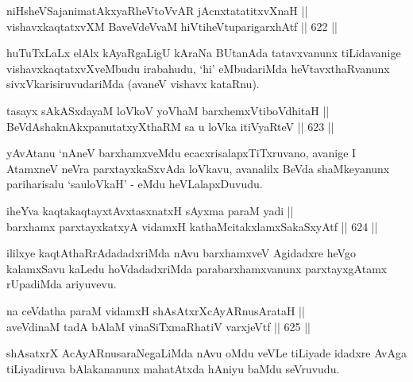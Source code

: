 
\begin{shl}
niHsheVSajanimatAkxyaRheVtoVvAR jAcnxtatatitxvXnaH || \\
vishavxkaqtatxvXM BaveVdeVvaM hiVtiheVtuparigarxhAtf \hfill || 622 ||  
\end{shl}

\begin{artha}
huTuTxLaLx elAlx kAyaRgaLigU kAraNa BUtanAda tatavxvanunx tiLidavanige
vishavxkaqtatxvXveMbudu irabahudu, `hi' eMbudariMda heVtavxthaRvanunx
sivxVkarisiruvudariMda (avaneV vishavx kataRnu).
\end{artha}


\begin{shl}
tasayx sAkASxdayaM loVkoV yoV\s haM barxhemxVtiboVdhitaH || \\
BeVdAshaknAkxpanutatxyXthaRM sa u loVka itiVyaRteV \hfill || 623 ||  
\end{shl}

\begin{artha}
yAvAtanu `nAneV barxhamxveMdu ecacxrisalapxTiTxruvano, avanige I AtamxneV neVra parxtayxkaSxvAda loVkavu, avanalilx BeVda shaMkeyanunx pariharisalu `sauloVkaH' - eMdu heVLalapxDuvudu.
\end{artha}


\begin{shl}
iheYva kaqtakaqtayxtAvxtasxnatxH sAyxma paraM yadi || \\
barxhamx parxtayxkatxyA vidamxH kathaMcitakxlamxSakaSxyAtf \hfill || 624 ||  
\end{shl}

\begin{artha}
ililxye kaqtAthaRrAdadadxriMda nAvu barxhamxveV Agidadxre heVgo kalamxSavu kaLedu hoVdadadxriMda parabarxhamxvanunx parxtayxgAtamx rUpadiMda ariyuvevu.
\end{artha}

\begin{shl}
na ceVdatha paraM vidamxH shAsAtxrXcAyARnusArataH || \\
aveVdinaM tadA bAlaM vinaSiTxmaRhatiV varxjeVtf \hfill || 625 ||  
\end{shl}

\begin{artha}
shAsatxrX AcAyARnusaraNegaLiMda nAvu oMdu veVLe tiLiyade idadxre AvAga
tiLiyadiruva bAlakananunx mahatAtxda hAniyu baMdu seVruvudu.
\end{artha}

